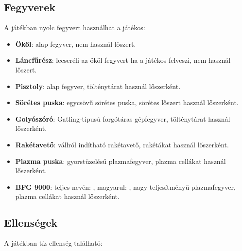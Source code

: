 \documentclass{thesis-ekf}
\theoremstyle{definition}
\theoremstyle{remark}
\begin{document}
\subsection{Fegyverek}

A játékban nyolc fegyvert használhat a játékos:

\begin{itemize}
    \item \textbf{Ököl}: alap fegyver, nem használ lőszert.
    \item \textbf{Láncfűrész}: lecseréli az ököl fegyvert ha a játékos felveszi,
        nem használ lőszert.
    \item \textbf{Pisztoly}: alap fegyver, tölténytárat használ lőszerként.
    \item \textbf{Sörétes puska}: egycsövű sörétes puska, sörétes lőszert
        használ lőszerként.
    \item \textbf{Golyószóró}: Gatling-típusú forgótáras gépfegyver,
        tölténytárat használ lőszerként.
    \item \textbf{Rakétavető}: vállról indítható rakétavető, rakétákat használ
        lőszerként.
    \item \textbf{Plazma puska}: gyorstüzelésű plazmafegyver, plazma cellákat
        használ lőszerként.
    \item \textbf{BFG 9000}: teljes nevén: ,
        magyarul: , nagy teljesítményű
        plazmafegyver, plazma cellákat használ lőszerként.
\end{itemize}
\cite[Fegyverek]{doomgame}

\subsection{Ellenségek}

A játékban tíz ellenség található:
\end{document}
